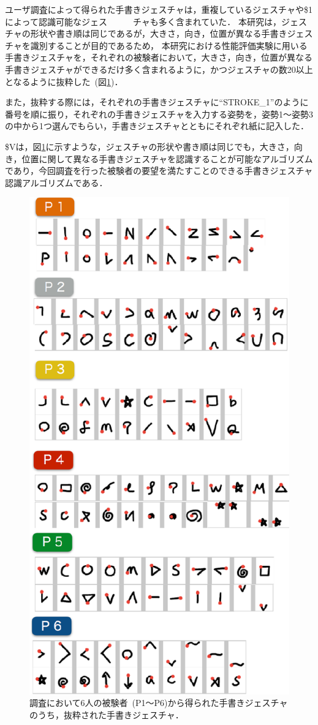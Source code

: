 ユーザ調査によって得られた手書きジェスチャは，重複しているジェスチャや\$1によって認識可能なジェス　　　チャも多く含まれていた．
本研究は，ジェスチャの形状や書き順は同じであるが，大きさ，向き，位置が異なる手書きジェスチャを識別することが目的であるため，
本研究における性能評価実験に用いる手書きジェスチャを，それぞれの被験者において，大きさ，向き，位置が異なる手書きジェスチャができるだけ多く含まれるように，かつジェスチャの数20以上となるように抜粋した~(図\ref{fig:elicetated_strokes})．

また，抜粋する際には，それぞれの手書きジェスチャに``STROKE\_1''のように番号を順に振り，それぞれの手書きジェスチャを入力する姿勢を，姿勢1〜姿勢3の中から1つ選んでもらい，手書きジェスチャとともにそれぞれ紙に記入した．

\$Vは，図\ref{fig:elicetated_strokes}に示すような，ジェスチャの形状や書き順は同じでも，大きさ，向き，位置に関して異なる手書きジェスチャを認識することが可能なアルゴリズムであり，今回調査を行った被験者の要望を満たすことのできる手書きジェスチャ認識アルゴリズムである．

\begin{figure} [t]
 \begin{center}
  \includegraphics [width=0.65\columnwidth]{img/elicitated_strokes.eps}
  \caption{調査において6人の被験者~(P1〜P6)から得られた手書きジェスチャのうち，抜粋された手書きジェスチャ．}
  \label{fig:elicetated_strokes}
 \end{center}
\end{figure}






